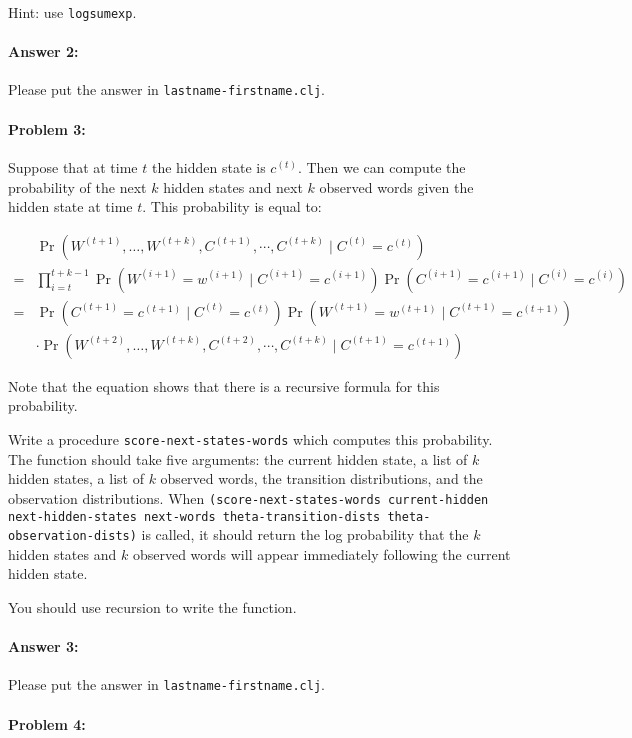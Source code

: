 \documentclass[10pt]{article}
\begin{document}
Hint: use \texttt{logsumexp}. 

\paragraph{Answer 2:} Please put the answer in
\texttt{lastname-firstname.clj}.

\hrulefill
\paragraph{Problem 3:}
Suppose that at time $t$ the hidden state is $c^{(t)}$. Then we
can compute the probability of the next $k$ hidden states and next
$k$ observed words given the hidden state at time $t$. This
probability is equal to:

$$\begin{align}
&\Pr(W^{(t+1)},\dots,W^{(t+k)},C^{(t+1)},\cdots,C^{(t+k)} \mid C^{(t)}=c^{(t)} )\\
=&\prod_{i=t}^{t+k-1} \Pr(W^{(i+1)}=w^{(i+1)} \mid C^{(i+1)}=c^{(i+1)}) \Pr(C^{(i+1)} =c^{(i+1)}\mid C^{(i)}=c^{(i)}) \\
= & \Pr(C^{(t+1)} =c^{(t+1)}\mid C^{(t)}=c^{(t)}) \Pr(W^{(t+1)} =w^{(t+1)}\mid C^{(t+1)}=c^{(t+1)}) \\
&\cdot \Pr(W^{(t+2)},\dots,W^{(t+k)},C^{(t+2)},\cdots,C^{(t+k)} \mid C^{(t+1)}=c^{(t+1)} )
\end{align}$$

Note that the equation shows that there is a recursive formula for
this probability.

Write a procedure \texttt{score-next-states-words} which computes this
probability. The function should take five arguments: the current
hidden state, a list of $k$ hidden states, a list of $k$ observed
words, the transition distributions, and the observation
distributions. When \texttt{(score-next-states-words current-hidden
  next-hidden-states next-words theta-transition-dists
  theta-observation-dists)} is called, it should return the log
probability that the $k$ hidden states and $k$ observed words will
appear immediately following the current hidden state.

You should use recursion to write the function. 

\paragraph{Answer 3:} Please put the answer in
\texttt{lastname-firstname.clj}.

\hrulefill
\paragraph{Problem 4:}
\end{document}
